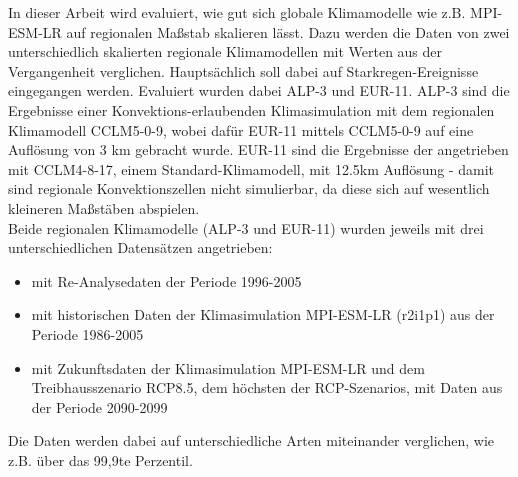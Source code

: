 In dieser Arbeit wird evaluiert, wie gut sich globale Klimamodelle wie z.B. MPI-ESM-LR auf regionalen Maßstab skalieren lässt. Dazu werden die Daten von zwei unterschiedlich skalierten regionale Klimamodellen mit Werten aus der Vergangenheit verglichen. Hauptsächlich soll dabei auf Starkregen-Ereignisse eingegangen werden. Evaluiert wurden dabei ALP-3 und EUR-11. ALP-3 sind  die Ergebnisse einer Konvektions-erlaubenden Klimasimulation mit dem regionalen Klimamodell CCLM5-0-9, wobei dafür EUR-11 mittels CCLM5-0-9 auf eine Auflösung von 3 km gebracht wurde. EUR-11 sind die Ergebnisse der angetrieben mit CCLM4-8-17, einem Standard-Klimamodell, mit 12.5km Auflösung - damit sind regionale Konvektionszellen nicht simulierbar, da diese sich auf wesentlich kleineren Maßstäben abspielen.\\
Beide regionalen Klimamodelle (ALP-3 und EUR-11) wurden jeweils mit drei unterschiedlichen Datensätzen angetrieben: 
\begin{itemize}
	\item mit Re-Analysedaten der Periode 1996-2005
	\item mit historischen Daten der Klimasimulation MPI-ESM-LR (r2i1p1) aus der Periode 1986-2005
	\item mit Zukunftsdaten der Klimasimulation MPI-ESM-LR und dem Treibhausszenario RCP8.5, dem höchsten der RCP-Szenarios, mit Daten aus der Periode 2090-2099
\end{itemize}
Die Daten werden dabei auf unterschiedliche Arten miteinander verglichen, wie z.B. über das 99,9te Perzentil.
